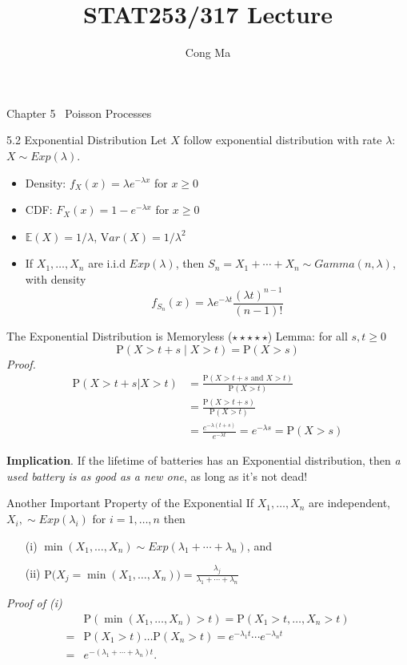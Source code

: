 \documentclass[letterpaper,handout, mathserif]{beamer}
\title{STAT253/317 Lecture \chapnum}
\date{}
\author{Cong Ma}
\def\p{\mathrm P}
\def\E{\mathbb E}
\def\V{\mathrm Var}
\begin{document}
\begin{frame}\maketitle\bigskip\begin{center}Chapter 5 \ Poisson Processes\end{center}\end{frame}
\begin{frame}{5.2 Exponential Distribution}
Let $X$ follow exponential distribution with rate $\lambda$: $X\sim Exp(\lambda)$.
\begin{itemize}
\item Density: $f_X(x)=\lambda e^{-\lambda x}$ for $x\ge 0$
\item CDF: $F_X(x)=1- e^{-\lambda x}$ for $x\ge 0$
\item $\E(X)=1/\lambda$, $\V(X)=1/\lambda^2$
\item If $X_1,\ldots,X_n$ are i.i.d $Exp(\lambda)$, then $S_n=X_1+\cdots+X_n\sim Gamma(n,\lambda)$,
with density
$$f_{S_n}(x)=\lambda e^{-\lambda t}\frac{(\lambda t)^{n-1}}{(n-1)!}$$
\end{itemize}
\end{frame}
\begin{frame}{The Exponential Distribution is Memoryless ($\star\star\star\star\star$)}
Lemma: for all $s, t \geq 0$
$$\p(X>t+s \mid X>t)=\p(X>s)$$
{\em Proof.}
\begin{align*}
\p(X>t+s|X>t)&=\frac{\p(X> t+s \mbox{ and }X>t)}{\p(X>t)}\\
&=\frac{\p(X> t+s)}{\p(X>t)}\\
&=\frac{e^{-\lambda(t+s)}}{e^{-\lambda t}}=e^{-\lambda s}=\p(X>s)
\end{align*}\bigskip

{\bf Implication}. If the lifetime of batteries has an Exponential distribution,
then {\em a used battery is as good as a new one}, as long as it's not dead!
\end{frame}
\begin{frame}{Another Important Property of the Exponential}
If $X_1,\ldots,X_n$ are independent, $X_i,\sim Exp(\lambda_i)$ for $i=1,\ldots,n$ then
\begin{itemize}
\item[(i)] $\min(X_1,\ldots,X_n)\sim Exp(\lambda_1+\cdots+\lambda_n)$, and
\item[(ii)] $\p\big(X_{j}=\min(X_1,\ldots,X_n)\big)=\displaystyle\frac{\lambda_j}{\lambda_1+\cdots+\lambda_n}$
\end{itemize}
{\em Proof of (i)}
\begin{align*}
&\p(\min(X_1,\ldots,X_n) > t) = \p(X_1 > t,\ldots,X_n > t)\\
={}& \p(X_1 > t)\ldots\p(X_n > t)= e^{-\lambda_1 t}\cdots e^{-\lambda_n t}\\
={}& e^{-(\lambda_1+\cdots+\lambda_n)t}.
\end{align*}
\end{frame}
\end{document}
